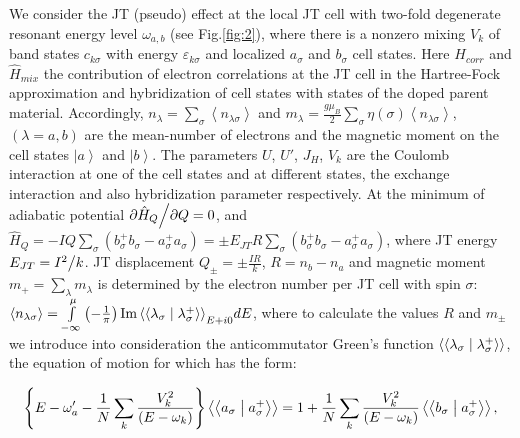 \documentclass[%
 reprint,
groupedaddress,
 amsmath,amssymb,
 aps,
prb,
]{revtex4-1}
\begin{document}
We consider the JT (pseudo) effect at the local JT cell with two-fold  degenerate resonant energy level $\omega _{a,b}$ (see Fig.\ref{fig:2}), where there is a nonzero mixing $V_k$ of band states $c_{k\sigma }$ with  energy $\varepsilon _{k\sigma }$  and localized $a_\sigma$ and $b_\sigma$  cell states.
Here $H_{corr}$ and $\hat H_{mix}$ the contribution of electron correlations at the JT cell in the Hartree-Fock approximation and hybridization of cell states with states of the doped parent material. Accordingly,  $n_\lambda   = \sum\limits_\sigma  {\left\langle {n_{\lambda \sigma } } \right\rangle }$ and $m_\lambda   = \frac{{g\mu _{B} }}{2}\sum\limits_\sigma  {\eta \left( \sigma  \right)\left\langle {n_{\lambda \sigma } } \right\rangle }$, $(\lambda  = a,b)$ are  the mean-number of electrons and the magnetic moment on the cell states $\left| a \right\rangle$ and $\left| b \right\rangle$. The parameters  $U$, $U'$, $J_H$, $V_k$ are  the Coulomb interaction at one of the cell states and at different states, the exchange interaction and also hybridization parameter respectively. At the minimum of adiabatic potential ${{\partial \hat H_Q } \mathord{\left/
 {\vphantom {{\partial \hat H_Q } {\partial Q}}} \right.
 \kern-\nulldelimiterspace} {\partial Q}} = 0$, and $\hat H_Q  =  - IQ\sum\limits_\sigma  {\left( {b_\sigma ^ +  b_\sigma ^{}  - a_\sigma ^ +  a_\sigma  } \right)}  =  \pm E_{JT} R\sum\limits_\sigma  {\left( {b_\sigma ^ +  b_\sigma ^{}  - a_\sigma ^ +  a_\sigma  } \right)}$, where JT energy $E_{JT}  = {{I^2 } \mathord{\left/
 {\vphantom {{I^2 } k}} \right.
 \kern-\nulldelimiterspace} k}$. JT displacement $Q_ \pm   =  \pm \frac{IR}{k}$, $R = n_b  - n_a$ and magnetic moment $m_+ = \sum\limits_\lambda  {m_\lambda  }$ is determined by the electron number per JT cell with spin $\sigma$: $\left\langle {n_{\lambda \sigma } } \right\rangle  = \int\limits_{ - \infty }^\mu  {\left( { - \frac{1}{\pi }} \right){\mathop{\rm Im}\nolimits} \left\langle {\left\langle {{\lambda _\sigma  }}
 \mathrel{\left | {\vphantom {{\lambda _\sigma  } {\lambda _\sigma ^ +  }}}
 \right. \kern-\nulldelimiterspace}
 {{\lambda _\sigma ^ +  }} \right\rangle } \right\rangle } _{E + i0} dE$, where to calculate the values $R$ and $m_\pm$ we introduce into consideration the anticommutator Green's function $\left\langle {\left\langle {{\lambda _\sigma  }}
 \mathrel{\left | {\vphantom {{\lambda _\sigma  } {\lambda _\sigma ^ +  }}}
 \right. \kern-\nulldelimiterspace}
 {{\lambda _\sigma ^ +  }} \right\rangle } \right\rangle$, the equation of motion for which has the form:
\begin{widetext}
\begin{equation}
\left\{ {E - \omega '_a  - \frac{1}{N}\sum\limits_k {\frac{{V_k^2 }}{{\left( {E - \omega _k } \right)}}} } \right\}\left\langle {\left\langle {{a_\sigma  }}
\mathrel{\left | {\vphantom {{a_\sigma  } {a_\sigma ^ +  }}}
\right. \kern-\nulldelimiterspace}
{{a_\sigma ^ +  }} \right\rangle } \right\rangle  = 1 + \frac{1}{N}\sum\limits_k {\frac{{V_k^2 }}{{\left( {E - \omega _k } \right)}}} \left\langle {\left\langle {{b_\sigma  }}
\mathrel{\left | {\vphantom {{b_\sigma  } {a_\sigma ^ +  }}}
\right. \kern-\nulldelimiterspace}
{{a_\sigma ^ +  }} \right\rangle } \right\rangle,
\label{eq:2}
\end{equation}
\end{widetext}
\end{document}
